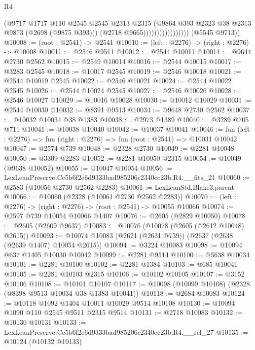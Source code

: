 \begin{lexlean}{R4}
\begin{coremodule}
                                    (@9717
                                      @1717
                                      @110
                                      @2545
                                      @2545
                                      @2313
                                      @2315
                                      (@9864 @393 @2323 @38 @2313 @9873 (@2698 (@9875 @393)))
                                      (@2718 @9665)))))))))))))))))
      (@5545 @9713))
@10008 := (root : @2541) -> @2541
@10010 := (left : @2276) -> (right : @2276) -> @10008
@10011 := @2546 @9511
@10012 := @2544 @10011
@10014 := @9644 @2730 @2562
@10015 := @2549 @10014
@10016 := @2544 @10015
@10017 := @3283 @2545
@10018 := @10017 @2545
@10019 := @2546 @10018
@10021 := @2544 @10019 @2545
@10022 := @2546 @10021
@10024 := @2544 @10022 @2545
@10026 := @2544 @10024 @2545
@10027 := @2546 @10026
@10028 := @2546 @10027
@10029 := @10016 @10028
@10030 := @10012 @10029
@10031 := @2544 @10030
@10032 := @8391 @9513
@10034 := @9648 @2730 @2562
@10037 := @10032 @10034 @38 @1383
@10038 := @2973 @1389
@10040 := @3289 @705 @711
@10041 := @10038 @10040
@10042 := @10037 @10041
@10046 := fun (left : @2276) => fun (right : @2276) => fun (root : @2541) => @10031 @10042
@10047 := @2574 @739
@10048 := @2328 @2730
@10049 := @2281 @10048
@10050 := @3309 @2283
@10052 := @2281 @10050 @2315
@10054 := @10049 (@9638 @10052)
@10055 := @10047 @10054
@10056 := LexLeanPreserve.Cc5b6f2e6d9333bad985206c2340ec23b.R4.__fits_21
@10060 := @2583 (@10056 @2730 @2562 @2283)
@10061 := LexLeanStd.Blake3.parent
@10066 := @10060 (@2328 (@10061 @2730 @2562 @2283))
@10070 := (left : @2276) -> (right : @2276) -> (root : @2541) -> @10055 @10066
@10074 := @2597 @739 @10054 @10066 @1407
@10076 := @2605 (@2829 @10050)
@10078 := @2605 (@2609 @9637)
@10083 := @10076 (@10078 (@2605 (@2612 @10048) @2615))
@10093 := @10074 @10083 (@2621 (@2631 @739)) (@2637 (@2638 (@2639 @1407) @10054 @2615))
@10094 := @3224 @10083
@10098 := @10094 @637 @1405 @10030 @10042
@10099 := @2281 @9514
@10100 := @5638 @10034
@10101 := @2281 @10100
@10102 := @2281 @1384
@10103 := @685 @10041
@10105 := @2281 @10103 @2315
@10106 := @10102 @10105
@10107 := @3152 @10106
@10108 := @10101 @10107
@10117 := @10098 (@10099 @10108) (@2328 (@8398 @9513 @10034 @38 @1383 @10041))
@10118 := @2684 @10083
@10124 := @10118 @1092 @1404 @10011 @10029 @9514 @10108
@10130 := @10094 @1090 @110 @2545 @9511 @2315 @9514
@10131 := @2718 @10083
@10132 := @10130 @10131
@10133 := LexLeanPreserve.Cc5b6f2e6d9333bad985206c2340ec23b.R4.__rel_27
@10135 := @10124 (@10132 @10133)

\end{coremodule}
\end{lexlean}
